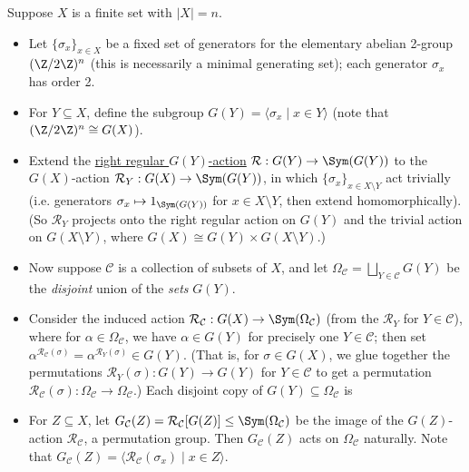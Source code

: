\begin{example}\label{eg:blaha_elem_technical_construction}
    Suppose $X$ is a finite set with $|X| = n$.
    \begin{itemize}
        \item Let $\{\sigma_x\}_{x \in X}$ be a fixed set of generators for the elementary abelian 2-group $(\Z/2\Z)^n$ (this is necessarily a minimal generating set); each generator $\sigma_x$ has order 2.
        \item For $Y \subseteq X$, define the subgroup $G(Y) = \langle \sigma_x \mid x \in Y \rangle$ (note that $(\Z/2\Z)^n \cong G(X)$).
        \item Extend the \hyperref[eg:right_regular_action]{right regular $G(Y)$-action} $\mathcal{R} : G(Y) \to \Sym(G(Y))$ to the $G(X)$-action $\mathcal{R}_Y : G(X) \to \Sym(G(Y))$, in which $\{\sigma_x\}_{x \in X \setminus Y}$ act trivially (i.e. generators $\sigma_x \mapsto 1_{\Sym(G(Y))}$ for $x \in X \setminus Y$, then extend homomorphically). (So $\mathcal{R}_Y$ projects onto the right regular action on $G(Y)$ and the trivial action on $G(X \setminus Y)$, where $G(X) \cong G(Y) \times G(X \setminus Y)$.)
        \item Now suppose $\mathcal{C}$ is a collection of subsets of $X$, and let $\Omega_\mathcal{C} = \bigsqcup_{Y \in \mathcal{C}} G(Y)$ be the \textit{disjoint} union of the \textit{sets} $G(Y)$.
        \item Consider the induced action $\mathcal{R}_\mathcal{C} : G(X) \to \Sym(\Omega_\mathcal{C})$ (from the $\mathcal{R}_Y$ for $Y \in \mathcal{C}$), where for $\alpha \in \Omega_\mathcal{C}$, we have $\alpha \in G(Y)$ for precisely one $Y \in \mathcal{C}$; then set $\alpha^{\mathcal{R}_\mathcal{C}(\sigma)} = \alpha^{\mathcal{R}_Y(\sigma)} \in G(Y)$. (That is, for $\sigma \in G(X)$, we glue together the permutations $\mathcal{R}_Y(\sigma) : G(Y) \to G(Y)$ for $Y \in \mathcal{C}$ to get a permutation $\mathcal{R}_\mathcal{C}(\sigma) : \Omega_\mathcal{C} \to \Omega_\mathcal{C}$.) Each disjoint copy of $G(Y) \subseteq \Omega_\mathcal{C}$ is 
        \item For $Z \subseteq X$, let $G_\mathcal{C}(Z) = \mathcal{R}_\mathcal{C}[G(Z)] \leq \Sym(\Omega_\mathcal{C})$ be the image of the $G(Z)$-action $\mathcal{R}_\mathcal{C}$, a permutation group. Then $G_\mathcal{C}(Z)$ acts on $\Omega_\mathcal{C}$ naturally. Note that $G_\mathcal{C}(Z) = \langle \mathcal{R}_\mathcal{C}(\sigma_x) \mid x \in Z \rangle$.
    \end{itemize}
\end{example}

